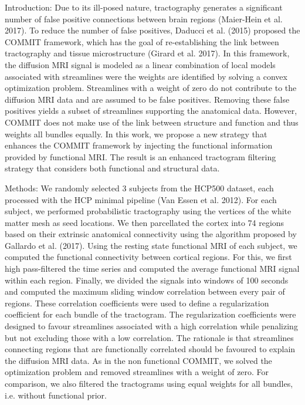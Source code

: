 Introduction:
Due to its ill-posed nature, tractography generates a significant number of false positive connections between brain
regions (Maier-Hein et al. 2017). To reduce the number of false positives, Daducci et al. (2015) proposed the COMMIT
framework, which has the goal of re-establishing the link between tractography and tissue microstructure (Girard et al.
2017). In this framework, the diffusion MRI signal is modeled as a linear combination of local models associated with
streamlines were the weights are identified by solving a convex optimization problem. Streamlines with a weight of zero do
not contribute to the diffusion MRI data and are assumed to be false positives. Removing these false positives yields a
subset of streamlines supporting the anatomical data. However, COMMIT does not make use of the link between structure
and function and thus weights all bundles equally. In this work, we propose a new strategy that enhances the COMMIT
framework by injecting the functional information provided by functional MRI. The result is an enhanced tractogram
filtering strategy that considers both functional and structural data.

Methods:
We randomly selected 3 subjects from the HCP500 dataset, each processed with the HCP minimal pipeline (Van Essen et
al. 2012). For each subject, we performed probabilistic tractography using the vertices of the white matter mesh as seed
locations. We then parcellated the cortex into 74 regions based on their extrinsic anatomical connectivity using the
algorithm proposed by Gallardo et al. (2017). Using the resting state functional MRI of each subject, we computed the
functional connectivity between cortical regions. For this, we first high pass-filtered the time series and computed the
average functional MRI signal within each region. Finally, we divided the signals into windows of 100 seconds and
computed the maximum sliding window correlation between every pair of regions. These correlation coefficients were
used to define a regularization coefficient for each bundle of the tractogram. The regularization coefficients were designed
to favour streamlines associated with a high correlation while penalizing but not excluding those with a low correlation.
The rationale is that streamlines connecting regions that are functionally correlated should be favoured to explain the
diffusion MRI data. As in the non functional COMMIT, we solved the optimization problem and removed streamlines with a
weight of zero. For comparison, we also filtered the tractograms using equal weights for all bundles, i.e. without functional
prior.

